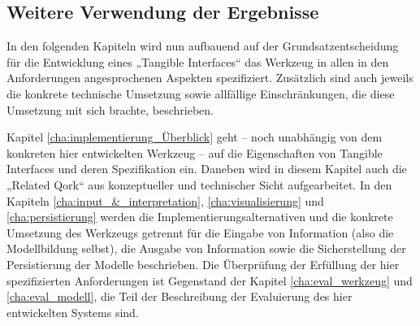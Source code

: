 \subsection{Weitere Verwendung der Ergebnisse}

In den folgenden Kapiteln wird nun aufbauend auf der Grundsatzentscheidung für die Entwicklung eines „Tangible Interfaces“ das Werkzeug in allen in den Anforderungen angesprochenen Aspekten spezifiziert. Zusätzlich sind auch jeweils die konkrete technische Umsetzung sowie allfällige Einschränkungen, die diese Umsetzung mit sich brachte, beschrieben.

Kapitel \ref{cha:implementierung_Überblick} geht -- noch unabhängig von dem konkreten hier entwickelten Werkzeug -- auf die Eigenschaften von Tangible Interfaces und deren Spezifikation ein. Daneben wird in diesem Kapitel auch die „Related Qork“ aus konzeptueller und technischer Sicht aufgearbeitet. In den Kapiteln \ref{cha:input_&_interpretation}, \ref{cha:visualisierung} und \ref{cha:persistierung} werden die Implementierungsalternativen und die konkrete Umsetzung des Werkzeugs getrennt für die Eingabe von Information (also die Modellbildung selbst), die Ausgabe von Information sowie die Sicherstellung der Persistierung der Modelle beschrieben. Die Überprüfung der Erfüllung der hier spezifizierten Anforderungen ist Gegenstand der Kapitel \ref{cha:eval_werkzeug} und \ref{cha:eval_modell}, die Teil der Beschreibung der Evaluierung des hier entwickelten Systems sind.

